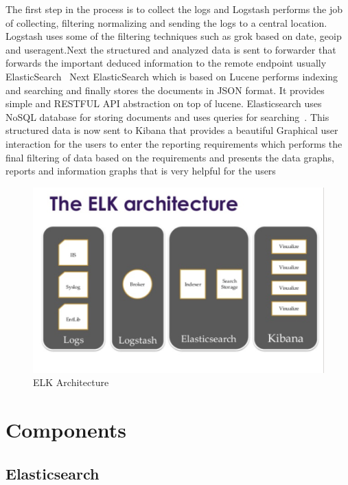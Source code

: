 The first step in the process is to collect the logs and Logstash performs the 
job of collecting, filtering normalizing and sending the logs to a central 
location. Logstash uses some of the filtering techniques such as grok based on 
date, geoip and useragent.Next the structured and analyzed data is sent to 
forwarder that forwards the important deduced information to the remote endpoint
 usually ElasticSearch~\cite{hid-sp18-410-elk-architecture}
 Next ElasticSearch which is based on Lucene performs indexing and searching and
  finally stores the documents in JSON format. It provides simple and RESTFUL 
  API abstraction on top of lucene. Elasticsearch uses NoSQL database for 
  storing documents and uses queries for searching~\cite{hid-sp18-410-elk-architecture}.
This structured data is now sent to Kibana that provides a beautiful Graphical 
user interaction for the users to enter the reporting requirements which 
performs the final filtering of data based on the requirements and presents 
the data graphs, reports and information graphs that is very helpful for the 
users~\cite{hid-sp18-410-elk-architecture}

\begin{figure}[!ht]
  \centering\includegraphics[width=\columnwidth]{image/ELK-Architecture.PNG}
  \caption{ELK Architecture~\cite{hid-sp18-410-elk-architecture-image}}
\label{f:architecture}
\end{figure}


\section{Components}


\subsection{Elasticsearch}

